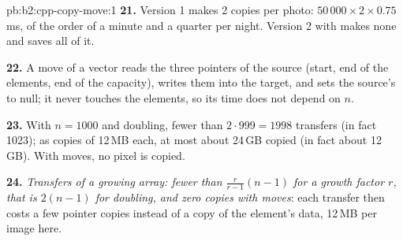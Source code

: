 \begin{solution}{pb:b2:cpp-copy-move:1}
\textbf{21.} Version 1 makes 2 copies per photo: $50\,000 \times 2 \times 0.75$\,ms, of the order of a minute and a
quarter per night. Version 2 with  makes none and saves all of it.

\textbf{22.} A move of a vector reads the three pointers of the source (start, end of the elements, end of the
capacity), writes them into the target, and sets the source's to null; it never touches the elements, so its time
does not depend on $n$.

\textbf{23.} With $n = 1000$ and doubling, fewer than $2 \cdot 999 = 1998$ transfers (in fact 1023); as copies of
12\,MB each, at most about 24\,GB copied (in fact about 12\,GB). With  moves, no pixel is copied.

\textbf{24.} \emph{Transfers of a growing array: fewer than $\frac{r}{r-1}(n-1)$ for a growth factor $r$, that is
$2(n-1)$ for doubling, and zero copies with  moves}: each transfer then costs a few pointer copies
instead of a copy of the element's data, 12\,MB per image here.
\end{solution}
